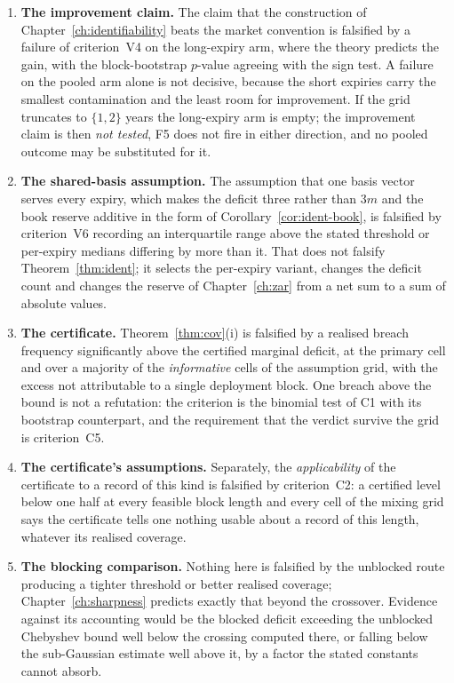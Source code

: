 \documentclass[../../../main.tex]{subfiles}
\begin{document}
\begin{enumerate}[label=\textbf{F\arabic*.},leftmargin=2.2\parindent]
\item \textbf{The improvement claim.} The claim that the construction of Chapter~\ref{ch:identifiability} beats the market convention is falsified by a failure of criterion~V4 on the long-expiry arm, where the theory predicts the gain, with the block-bootstrap $p$-value agreeing with the sign test. A failure on the pooled arm alone is not decisive, because the short expiries carry the smallest contamination and the least room for improvement. If the grid truncates to $\{1,2\}$ years the long-expiry arm is empty; the improvement claim is then \emph{not tested}, F5 does not fire in either direction, and no pooled outcome may be substituted for it.
\item \textbf{The shared-basis assumption.} The assumption that one basis vector serves every expiry, which makes the deficit three rather than $3m$ and the book reserve additive in the form of Corollary~\ref{cor:ident-book}, is falsified by criterion~V6 recording an interquartile range above the stated threshold or per-expiry medians differing by more than it. That does not falsify Theorem~\ref{thm:ident}; it selects the per-expiry variant, changes the deficit count and changes the reserve of Chapter~\ref{ch:zar} from a net sum to a sum of absolute values.
\item \textbf{The certificate.} Theorem~\ref{thm:cov}(i) is falsified by a realised breach frequency significantly above the certified marginal deficit, at the primary cell and over a majority of the \emph{informative} cells of the assumption grid, with the excess not attributable to a single deployment block. One breach above the bound is not a refutation: the criterion is the binomial test of C1 with its bootstrap counterpart, and the requirement that the verdict survive the grid is criterion~C5.
\item \textbf{The certificate's assumptions.} Separately, the \emph{applicability} of the certificate to a record of this kind is falsified by criterion~C2: a certified level below one half at every feasible block length and every cell of the mixing grid says the certificate tells one nothing usable about a record of this length, whatever its realised coverage.
\item \textbf{The blocking comparison.} Nothing here is falsified by the unblocked route producing a tighter threshold or better realised coverage; Chapter~\ref{ch:sharpness} predicts exactly that beyond the crossover. Evidence against its accounting would be the blocked deficit exceeding the unblocked Chebyshev bound well below the crossing computed there, or falling below the sub-Gaussian estimate well above it, by a factor the stated constants cannot absorb.

\end{enumerate}
\end{document}
